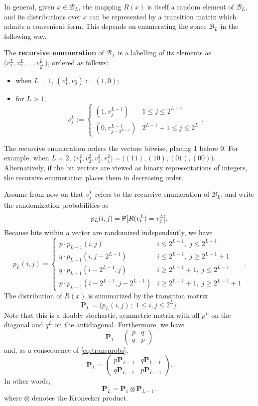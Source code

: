 \documentclass[11pt,draft]{article}
\newcommand{\Bsp}{\mathcal{B}}
\newcommand{\Pm}{\mathbf{P}}
\begin{document}

In general, given $x\in\Bsp_L$, the mapping $R(x)$ is itself a random element of
$\Bsp_L$, and its distributions over $x$ can be represented by a transition
matrix which admits a convenient form.
This depends on enumerating the space $\Bsp_L$ in the following way.

\begin{defn}
The \textbf{recursive enumeration} of $\Bsp_L$ is a labelling of its elements
as $\big(v_1^L,v_2^L,\dots,v_{2^L}^L\big)$, ordered as follows:
\begin{itemize}
\item when $L=1$, $(v_1^1, v_2^1) := (1, 0)$;
\item for $L > 1$,
\[ v_j^L := \begin{cases}(1, v_j^{L-1}) & 1 \leq j \leq 2^{L-1} \\
    (0, v_{j - 2^{L-1}}^{L-1}) & 2^{L-1} + 1 \leq j \leq 2^L \end{cases}. \]
\end{itemize}
\end{defn}

The recursive enumeration orders the vectors bitwise, placing 1 before 0.
For example, when $L=2$,
$\big(v_1^2, v_2^2, v_3^2, v_4^2\big) = \big((11), (10), (01), (00)\big)$.
Alternatively, if the bit vectors are viewed as binary representations of
integers, the recursive enumeration places them in decreasing order.

Assume from now on that $v_j^L$ refers to the recursive enumeration of
$\Bsp_L$, and write the randomization probabilities as
\[ p_L(i,j) = \P[R(v_i^L) = v_j^L]. \]
Because bits within a vector are randomized independently, we have
\begin{equation} \label{eq:transprobs}
p_L(i,j) = \begin{cases}
p\cdot p_{L-1}(i, j) &
    i \leq 2^{L-1},\; j \leq 2^{L-1} \\
q\cdot p_{L-1}(i,j - 2^{L-1}) &
    i \leq 2^{L-1},\; j \geq 2^{L-1} + 1 \\
q\cdot p_{L-1}(i - 2^{L-1},j) &
    i \geq 2^{L-1} + 1,\; j \leq 2^{L-1} \\
p\cdot p_{L-1}(i - 2^{L-1},j - 2^{L-1}) &
    i \geq 2^{L-1} + 1,\; j \geq 2^{L-1} + 1
 \end{cases}.
\end{equation}
The distribution of $R(x)$ is summarized by the transition matrix
\[ \Pm_L = \Big(p_L(i,j)\,;\; 1 \leq i,j \leq 2^L\Big). \]
Note that this is a doubly stochastic, symmetric matrix with all $p^L$ on
the diagonal and $q^L$ on the antidiagonal.
Furthermore, we have
\[ \Pm_1 = \begin{pmatrix}p & q \\ q & p \end{pmatrix} \]
and, as a consequence of \eqref{eq:transprobs},
\[ \Pm_L = \begin{pmatrix} p\Pm_{L-1} & q\Pm_{L-1} \\
q\Pm_{L-1} & p\Pm_{L-1} \end{pmatrix}. \]
In other words,
\[ \Pm_L = \Pm_1 \otimes \Pm_{L-1}, \]
where $\otimes$ denotes the Kronecker product.
\end{document}

